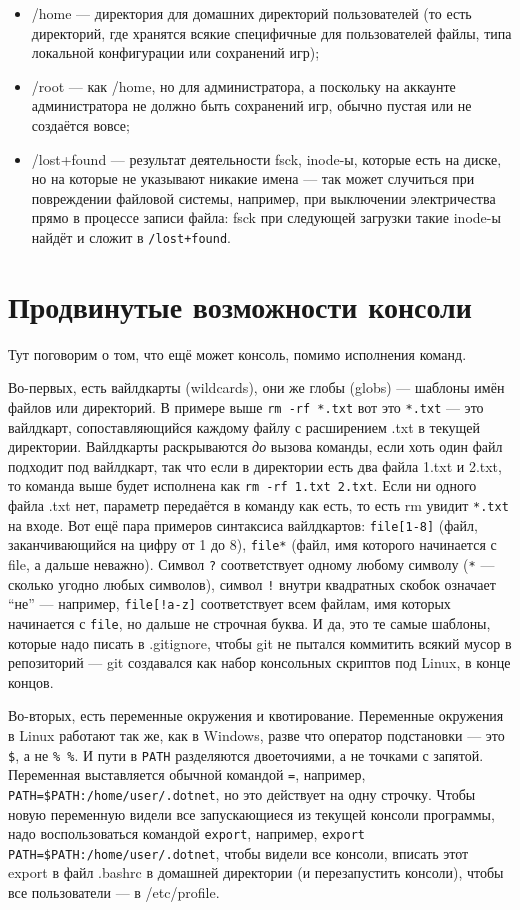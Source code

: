 \documentclass{../../text-style}
\begin{document}
\begin{itemize}
    \item /home --- директория для домашних директорий пользователей (то есть директорий, где хранятся всякие специфичные для пользователей файлы, типа локальной конфигурации или сохранений игр);
    \item /root --- как /home, но для администратора, а поскольку на аккаунте администратора не должно быть сохранений игр, обычно пустая или не создаётся вовсе;
    \item /lost+found --- результат деятельности fsck, inode-ы, которые есть на диске, но на которые не указывают никакие имена --- так может случиться при повреждении файловой системы, например, при выключении электричества прямо в процессе записи файла: fsck при следующей загрузки такие inode-ы найдёт и сложит в \verb|/lost+found|.
\end{itemize}

\section{Продвинутые возможности консоли}

Тут поговорим о том, что ещё может консоль, помимо исполнения команд.

Во-первых, есть вайлдкарты (wildcards), они же глобы (globs) --- шаблоны имён файлов или директорий.
В примере выше \verb|rm -rf *.txt| вот это \verb|*.txt| --- это вайлдкарт, сопоставляющийся каждому файлу с расширением .txt в текущей директории.
Вайлдкарты раскрываются \emph{до} вызова команды, если хоть один файл подходит под вайлдкарт, так что если в директории есть два файла 1.txt и 2.txt, то команда выше будет исполнена как \verb|rm -rf 1.txt 2.txt|. 
Если ни одного файла .txt нет, параметр передаётся в команду как есть, то есть rm увидит \verb|*.txt| на входе.
Вот ещё пара примеров синтаксиса вайлдкартов: \verb|file[1-8]| (файл, заканчивающийся на цифру от 1 до 8), \texttt{file*} (файл, имя которого начинается с file, а дальше неважно).
Символ \verb|?| соответствует одному любому символу (\verb|*| --- сколько угодно любых символов), символ \verb|!| внутри квадратных скобок означает \enquote{не} --- например, \verb|file[!a-z]| соответствует всем файлам, имя которых начинается с \verb|file|, но дальше не строчная буква.
И да, это те самые шаблоны, которые надо писать в .gitignore, чтобы git не пытался коммитить всякий мусор в репозиторий --- git создавался как набор консольных скриптов под Linux, в конце концов.

Во-вторых, есть переменные окружения и квотирование. Переменные окружения в Linux работают так же, как в Windows, разве что оператор подстановки --- это \verb|$|, а не \verb|% %|.
И пути в \verb|PATH| разделяются двоеточиями, а не точками с запятой.
Переменная выставляется обычной командой \verb|=|, например, \verb|PATH=$PATH:/home/user/.dotnet|, но это действует на одну строчку.
Чтобы новую переменную видели все запускающиеся из текущей консоли программы, надо воспользоваться командой \verb|export|, например, \verb|export PATH=$PATH:/home/user/.dotnet|, чтобы видели все консоли, вписать этот export в файл .bashrc в домашней директории (и перезапустить консоли), чтобы все пользователи --- в /etc/profile.
\end{document}
